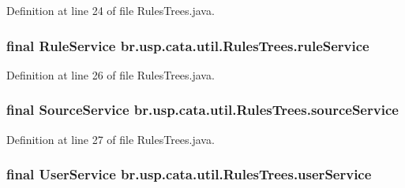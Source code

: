 Definition at line 24 of file Rules\+Trees.\+java.

\hypertarget{classbr_1_1usp_1_1cata_1_1util_1_1_rules_trees_a93fb83138e4ab0938c34e06d3eb3b48a}{
\subsubsection[{rule\+Service}]{\setlength{\rightskip}{0pt plus 5cm}final {\bf Rule\+Service} br.\+usp.\+cata.\+util.\+Rules\+Trees.\+rule\+Service\hspace{0.3cm}{\ttfamily [private]}}}\label{classbr_1_1usp_1_1cata_1_1util_1_1_rules_trees_a93fb83138e4ab0938c34e06d3eb3b48a}


Definition at line 26 of file Rules\+Trees.\+java.

\hypertarget{classbr_1_1usp_1_1cata_1_1util_1_1_rules_trees_a891861c5b386059c58675590a8878176}{
\subsubsection[{source\+Service}]{\setlength{\rightskip}{0pt plus 5cm}final {\bf Source\+Service} br.\+usp.\+cata.\+util.\+Rules\+Trees.\+source\+Service\hspace{0.3cm}{\ttfamily [private]}}}\label{classbr_1_1usp_1_1cata_1_1util_1_1_rules_trees_a891861c5b386059c58675590a8878176}


Definition at line 27 of file Rules\+Trees.\+java.

\hypertarget{classbr_1_1usp_1_1cata_1_1util_1_1_rules_trees_acc11381172d0de06c7710395f7499844}{
\subsubsection[{user\+Service}]{\setlength{\rightskip}{0pt plus 5cm}final {\bf User\+Service} br.\+usp.\+cata.\+util.\+Rules\+Trees.\+user\+Service\hspace{0.3cm}{\ttfamily [private]}}}\label{classbr_1_1usp_1_1cata_1_1util_1_1_rules_trees_acc11381172d0de06c7710395f7499844}


